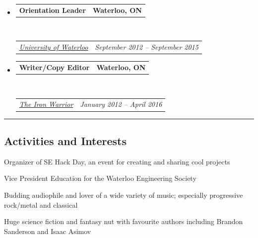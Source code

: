 \documentclass[10pt,letterpaper]{article}
\makeatletter
\newcommand{\headerrow}[2]
{\begin{tabular*}{\linewidth}{l@{\extracolsep{\fill}}r}
	#1 &
	#2 \\
\end{tabular*}}
\makeatother
\begin{document}
\begin{itemize}[leftmargin=*]
    \item[]
	\headerrow
		{\textbf{Orientation Leader}}
		{\textbf{Waterloo, ON}}
	\\
	\headerrow
		{\emph{\href{https://www.orientation.uwaterloo.ca}{University of Waterloo}}}
		{\emph{September 2012 -- September 2015}}
  	
  	 \item[]
	\headerrow
		{\textbf{Writer/Copy Editor}}
		{\textbf{Waterloo, ON}}
	\\
	\headerrow
		{\emph{\href{https://www.iwarrior.ca}{The Iron Warrior}}}
		{\emph{January 2012 -- April 2016}}
	
\end{itemize}
\hrule
\vspace{-0.4em}
\subsection*{Activities and Interests}

\begin{itemize*}
\item Organizer of SE Hack Day, an event for creating and sharing cool projects
\item Vice President Education for the Waterloo Engineering Society
\item Budding audiophile and lover of a wide variety of music; especially progressive rock/metal and classical
\item Huge science fiction and fantasy nut with favourite authors including Brandon Sanderson and Isaac Asimov
\end{itemize*}
\end{document}
